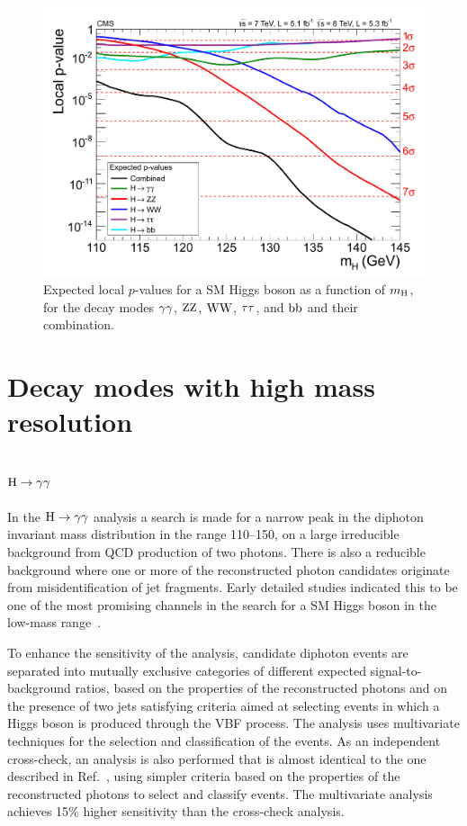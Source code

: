 \documentclass[11pt,twoside,a4paper,cmspaper,final]{cms-tdr}
\begin{document}
\begin{figure}[htbp]
  \begin{center}
    \includegraphics[width=\cmsFigWideWidth]{rect_pvala_allexp_bydecay_smallGGScale_wideX}
    \caption{Expected local $p$-values for a SM Higgs boson as a function of
      $m_{\mathrm{H}}$, for the decay modes $\gamma\gamma$, $\mathrm{Z}\mathrm{Z}$, $\mathrm{W}\mathrm{W}$, $\tau\tau$, and $\mathrm{b}\mathrm{b}$ and their combination.
}
    \label{fig:exp-pvalues}
  \end{center}
\end{figure}

\section{Decay modes with high mass resolution}

\subsection{\texorpdfstring{$\mathrm{H}\to\gamma\gamma$}{H to gamma gamma}\label{sec:Hgg}}

In the $\mathrm{H}\to\gamma\gamma$ analysis a search is made for a narrow peak in the diphoton
invariant mass distribution in the range 110--150\GeV,
on a large irreducible background from QCD production of two photons.
There is also a reducible background where one or more
of the reconstructed photon candidates originate from
misidentification of jet fragments.
Early detailed studies indicated this to be one of the most promising channels
in the search for a SM Higgs boson in the low-mass range~\cite{Seez1990a}.

To enhance the sensitivity of the analysis, candidate diphoton events are separated into mutually
exclusive categories of different expected signal-to-background ratios,
based on the properties of the reconstructed photons and on
the presence of two jets satisfying criteria aimed at selecting events
in which a Higgs boson is produced through the VBF process.
The analysis uses multivariate techniques
for the selection and classification of the events.
As an independent cross-check, an analysis is also performed
that is almost identical to the one described in Ref.~\cite{Chatrchyan:2012tw},
using simpler criteria based on the properties of the reconstructed photons to
select and classify events.
The multivariate analysis achieves 15\% higher sensitivity than the
cross-check analysis.
\end{document}
